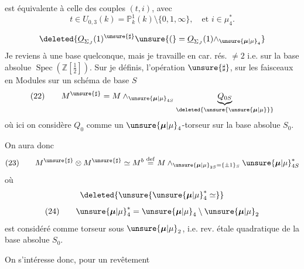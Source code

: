 
est équivalente à celle des couples $(t,i)$, avec
\[
t\in U_{0,3}(k)=\mathbb{P}^1_k(k)\setminus\{0,1,\infty\},\quad\text{et }i\in\mu_4^*.
\]

\[
\deleted{\underline{O}_{\Sigma_J}(1)^{\unsure{\sharp}}\unsure{(}=\underline{O}_{\Sigma_J}(1)\wedge_{\unsure{\boldsymbol{\mu}|\mu}_4}}
\]
Je reviens à une base quelconque, mais je travaille en car. rés. $\ne2$ i.e. sur la base absolue $\operatorname{Spec}(\mathbb{Z}[\frac12])$. Sur  je définis, l'opération \deleted{\unsure{$\otimes$}} $\unsure{\sharp}$, sur les  faisceaux en Modules  sur un schéma de base $S$
\[
(22)\qquad M^{\unsure{\sharp}}=M\wedge_{\unsure{\boldsymbol{\mu}|\mu}_{4S}}\underbrace{Q_{0S}}_{\deleted{\unsure{\unsure{\boldsymbol{\mu}|\mu}}}}
\]
où ici on considère $Q_0$ comme un $\unsure{\boldsymbol{\mu}|\mu}_4$-torseur sur la base absolue $S_0$.

On aura donc
\[
(23)\qquad M^{\unsure{\sharp}}\otimes M^{\unsure{\sharp}}\simeq M^b\overset{\mathrm{def}}{=}M\wedge_{\unsure{\boldsymbol{\mu}|\mu}_{2S}=\{\pm1\}_S}\unsure{\boldsymbol{\mu}|\mu}_{4S}^*
\]
où
\[
\deleted{\unsure{\unsure{\boldsymbol{\mu}|\mu}_4^*\simeq}}
\]
\[
(24)\qquad\unsure{\boldsymbol{\mu}|\mu}_4^*=\unsure{\boldsymbol{\mu}|\mu}_4\setminus\unsure{\boldsymbol{\mu}|\mu}_2
\]
est considéré comme torseur sous $\unsure{\boldsymbol{\mu}|\mu}_2$, i.e. rev. étale quadratique de la base absolue $S_0$.

On s'intéresse donc,  pour un revêtement
